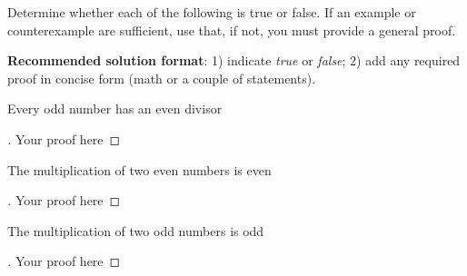 \documentclass[12pt]{article}
\newenvironment{exercise}[2][Exercise]{\begin{trivlist}
\item[\hskip \labelsep {\bfseries #1}\hskip \labelsep {\bfseries #2.}]}{\end{trivlist}}
\newenvironment{solution}[1][{\color{red} Solution:}]{\begin{trivlist}
\item[\hskip \labelsep {\bfseries #1}\hskip \labelsep {\bfseries}]}{\end{trivlist}}
\begin{document}
\clearpage

\begin{exercise}{2}

Determine whether each of the following is true or false. If an example or counterexample are sufficient, use that, if not, you must provide a general proof.

\textbf{Recommended solution format}: 1) indicate \textit{true} or \textit{false}; 2) add any required proof in concise form (math or a couple of statements).

\begin{enumerate}[(a)]
    \item Every odd number has an even divisor
    \begin{solution} 
        \begin{proof}[\unskip\nopunct]
            Your proof here
        \end{proof}
    \end{solution}

    \item The multiplication of two even numbers is even
    \begin{solution} 
        \begin{proof}[\unskip\nopunct]
            Your proof here
        \end{proof}
    \end{solution}    
        
    \item The multiplication of two odd numbers is odd
    \begin{solution} 
        \begin{proof}[\unskip\nopunct]
            Your proof here
        \end{proof}
    \end{solution}

    
    
    \end{enumerate}
\end{exercise}

\clearpage
\end{document}
